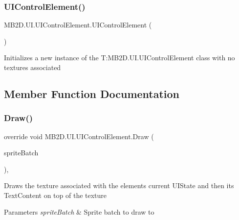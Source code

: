 \subsubsection{\texorpdfstring{U\+I\+Control\+Element()}{UIControlElement()}\hspace{0.1cm}{\footnotesize\ttfamily [2/2]}}
{\footnotesize\ttfamily M\+B2\+D.\+U\+I.\+U\+I\+Control\+Element.\+U\+I\+Control\+Element (\begin{DoxyParamCaption}{ }\end{DoxyParamCaption})\hspace{0.3cm}{\ttfamily [inline]}}



Initializes a new instance of the T\+:\+M\+B2\+D.\+U\+I.\+U\+I\+Control\+Element class with no textures associated 



\subsection{Member Function Documentation}
\hypertarget{class_m_b2_d_1_1_u_i_1_1_u_i_control_element_afac0cbbbbead7c7348401075cda433ba}{}\label{class_m_b2_d_1_1_u_i_1_1_u_i_control_element_afac0cbbbbead7c7348401075cda433ba} 
\subsubsection{\texorpdfstring{Draw()}{Draw()}}
{\footnotesize\ttfamily override void M\+B2\+D.\+U\+I.\+U\+I\+Control\+Element.\+Draw (\begin{DoxyParamCaption}\item[{Sprite\+Batch}]{sprite\+Batch }\end{DoxyParamCaption})\hspace{0.3cm}{\ttfamily [inline]}, {\ttfamily [virtual]}}



Draws the texture associated with the elements current U\+I\+State and then its Text\+Content on top of the texture 


\begin{DoxyParams}{Parameters}
{\em sprite\+Batch} & Sprite batch to draw to\\
\hline
\end{DoxyParams}


